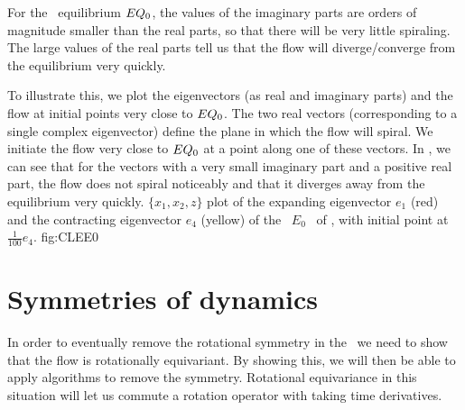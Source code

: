 For the \cLe\ equilibrium $EQ_{0}$, the values of the
imaginary parts are orders of magnitude smaller than the real
parts, so that there will be very little spiraling. The large
values of the real parts tell us that the flow will
diverge/converge from the equilibrium very quickly.

To illustrate this, we plot the eigenvectors (as real and
imaginary parts) and the flow at initial points very close to
$EQ_{0}$. The two real vectors (corresponding to a single
complex eigenvector) define the plane in which the flow will
spiral. We initiate the flow very close to $EQ_{0}$ at a
point along one of these vectors. In ,
we can see that for the vectors with a very small imaginary
part and a positive real part, the flow does not spiral
noticeably and that it diverges away from the equilibrium very
quickly.
{}{
$\{x_1, x_2, z\}$ plot of the expanding eigenvector $e_1$
(red) and the contracting eigenvector $e_4$ (yellow) of the
\eqv\ $E_0$ \stabmat\ of \cLf, with initial point at $\frac{1}{100}
e_4$.
}
{fig:CLEE0}


\section{Symmetries of dynamics}
\label{sect:SymmDyn}

In order to eventually remove the rotational symmetry in the
\cLf\, we need to show that the flow is rotationally
equivariant. By showing this, we will then be able to apply
algorithms to remove the symmetry. Rotational equivariance in
this situation will let us commute a rotation operator with
taking time derivatives.

